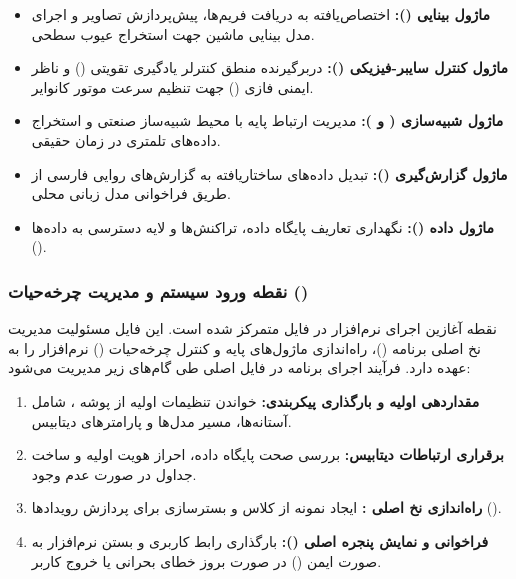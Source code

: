 \documentclass[a4paper, 10pt, twocolumn]{article}
\begin{document}
	\begin{itemize}
		\item \textbf{ماژول بینایی ():} اختصاص‌یافته به دریافت فریم‌ها، پیش‌پردازش تصاویر و اجرای مدل بینایی ماشین جهت استخراج عیوب سطحی.
		\item \textbf{ماژول کنترل سایبر-فیزیکی ():} دربرگیرنده منطق کنترلر یادگیری تقویتی () و ناظر ایمنی فازی () جهت تنظیم سرعت موتور کانوایر.
		\item \textbf{ماژول شبیه‌سازی ( و ):} مدیریت ارتباط پایه با محیط شبیه‌ساز صنعتی و استخراج داده‌های تلمتری در زمان حقیقی.
		\item \textbf{ماژول گزارش‌گیری ():} تبدیل داده‌های ساختاریافته به گزارش‌های روایی فارسی از طریق فراخوانی مدل زبانی محلی.
		\item \textbf{ماژول داده ():} نگهداری تعاریف پایگاه داده، تراکنش‌ها و لایه دسترسی به داده‌ها ().
	\end{itemize}
	
	\subsubsection{نقطه ورود سیستم و مدیریت چرخه‌حیات ()}
	نقطه آغازین اجرای نرم‌افزار در فایل  متمرکز شده است. این فایل مسئولیت مدیریت نخ اصلی برنامه ()، راه‌اندازی ماژول‌های پایه و کنترل چرخه‌حیات () نرم‌افزار را به عهده دارد. فرآیند اجرای برنامه در فایل اصلی طی گام‌های زیر مدیریت می‌شود:
	
	\begin{enumerate}
		\item \textbf{مقداردهی اولیه و بارگذاری پیکربندی:} خواندن تنظیمات اولیه از پوشه ، شامل آستانه‌ها، مسیر مدل‌ها و پارامترهای دیتابیس.
		\item \textbf{برقراری ارتباطات دیتابیس:} بررسی صحت پایگاه داده، احراز هویت اولیه و ساخت جداول در صورت عدم وجود.
		\item \textbf{راه‌اندازی نخ اصلی :} ایجاد نمونه از کلاس  و بسترسازی برای پردازش رویدادها ().
		\item \textbf{فراخوانی و نمایش پنجره اصلی ():} بارگذاری رابط کاربری و بستن نرم‌افزار به صورت ایمن () در صورت بروز خطای بحرانی یا خروج کاربر.
	\end{enumerate}
	
\end{document}
